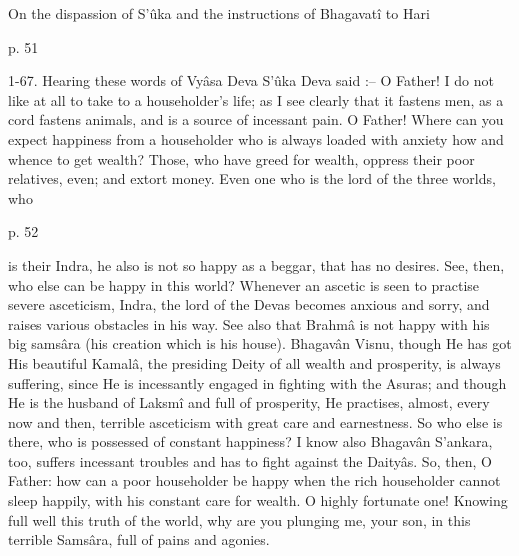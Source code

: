 On the dispassion of S’ûka and the instructions of Bhagavatî to Hari

 

p. 51

 

1-67. Hearing these words of Vyâsa Deva S’ûka Deva said :-- O Father! I do not like at all to take to a householder's life; as I see clearly that it fastens men, as a cord fastens animals, and is a source of incessant pain. O Father! Where can you expect happiness from a householder who is always loaded with anxiety how and whence to get wealth? Those, who have greed for wealth, oppress their poor relatives, even; and extort money. Even one who is the lord of the three worlds, who

 

p. 52

 

is their Indra, he also is not so happy as a beggar, that has no desires. See, then, who else can be happy in this world? Whenever an ascetic is seen to practise severe asceticism, Indra, the lord of the Devas becomes anxious and sorry, and raises various obstacles in his way. See also that Brahmâ is not happy with his big samsâra (his creation which is his house). Bhagavân Visnu, though He has got His beautiful Kamalâ, the presiding Deity of all wealth and prosperity, is always suffering, since He is incessantly engaged in fighting with the Asuras; and though He is the husband of Laksmî and full of prosperity, He practises, almost, every now and then, terrible asceticism with great care and earnestness. So who else is there, who is possessed of constant happiness? I know also Bhagavân S'ankara, too, suffers incessant troubles and has to fight against the Daityâs. So, then, O Father: how can a poor householder be happy when the rich householder cannot sleep happily, with his constant care for wealth. O highly fortunate one! Knowing full well this truth of the world, why are you plunging me, your son, in this terrible Samsâra, full of pains and agonies.

 

